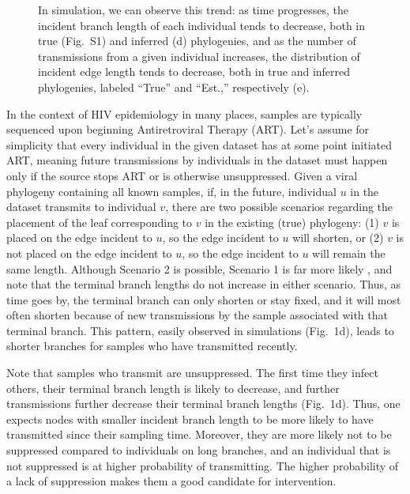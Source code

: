 \documentclass[a4paper,10pt]{article}
\newcommand{\PLWH}{sample\xspace}
\begin{document}
\begin{figure}[!tp]
{In simulation, we can observe this trend: as time progresses, the incident branch length of each individual tends to decrease, both in true (Fig.~S1) and inferred (d) phylogenies, and as the number of transmissions from a given individual increases, the distribution of incident edge length tends to decrease, both in true and inferred phylogenies, labeled ``True'' and ``Est.,'' respectively (e).}
\label{fig:diagram}
\end{figure}


In the context of HIV epidemiology in many places,
\PLWH{s} are typically sequenced
upon beginning Antiretroviral Therapy (ART).
Let's assume for simplicity that every individual in the given dataset has at some point initiated ART,
meaning future transmissions by individuals in the dataset must happen only if the source stops ART or is otherwise unsuppressed. %
Given a viral phylogeny containing all known \PLWH{s},
if, in the future,
individual $u$ in the dataset transmits to individual $v$,
there are two possible scenarios regarding the placement of the leaf corresponding to $v$ in the existing (true) phylogeny:
(1) $v$ is placed on the edge incident to $u$, so the edge incident to $u$ will shorten, or (2) $v$ is not placed on the edge incident to $u$, so the edge incident to $u$ will remain the same length.
Although Scenario 2 is possible,
Scenario 1 is far more likely \supercite{Romero-Severson2016}, and note that the terminal branch lengths do not increase in either scenario. 
Thus, as time goes by, the terminal branch can only shorten or stay fixed, and it will most often shorten because of new transmissions by the \PLWH associated with that terminal branch.
This pattern, easily observed in simulations (Fig.~1d), leads to shorter branches for \PLWH{s} who have transmitted recently.

Note that \PLWH{s} who transmit are unsuppressed. The first time they infect others, their terminal branch length is likely to decrease, and further transmissions further decrease their terminal branch lengths (Fig.~1d). 
Thus, one expects nodes with smaller incident branch length to be more likely to have transmitted since their sampling time.
Moreover, they are more likely not to be  suppressed compared to individuals on long branches, and an individual that is not suppressed is at higher probability of transmitting. 
The higher probability of a lack of suppression makes them a good candidate for intervention. 
\end{document}
